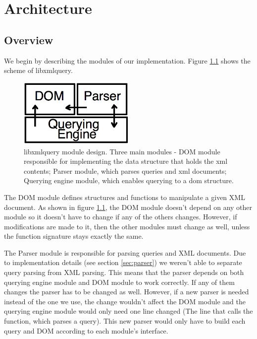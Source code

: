 \documentclass[a4paper]{report}
\begin{document}
\chapter{Architecture}\label{chap:arch}
\section{Overview}\label{sec:overview}
	We begin by describing the modules of our implementation. Figure \ref{fig:arch} shows the scheme of libxmlquery. 

	 \begin{figure}[h!]
		\centering
		\label{fig:arch}
		\includegraphics[width=0.5\textwidth] {arch}
		\caption{libxmlquery module design. Three main modules - DOM module responsible for implementing the data structure that holds the xml contents; Parser module, which parses queries and xml documents; 
		Querying engine module, which enables querying to a dom structure.}
	 \end{figure}
	 
	The DOM module defines structures and functions to manipulate a given XML document. As shown in figure \ref{fig:arch}, the DOM module doesn't depend on any other module so it doesn't have to change if any of the 
	others changes. However, if modifications are made to it, then the other modules must change as well, unless the function signature stays exactly the same.
	
	The Parser module is responsible for parsing queries and XML documents. Due to implementation details (see section \ref{sec:parser}) we weren't able to separate query parsing from XML parsing. This means that the 
	parser depends on both querying engine module and DOM module to work correctly. If any of them changes the parser has to be changed as well. However, if a new parser is needed instead of the one we use, the
	change wouldn't affect the DOM module and the querying engine module would only need one line changed (The line that calls the function, which parses a query). This new parser would only have to build each query 
	and DOM according to each module's interface.
	
\end{document}
